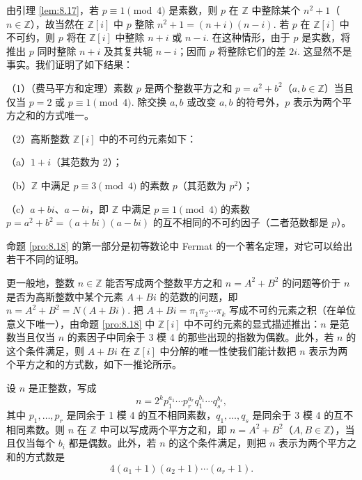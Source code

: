 由引理 \ref{lem:8.17}，若 \(p \equiv 1 \pmod 4\) 是素数，则 \(p\) 在 \(\mathbb{Z}\) 中整除某个 \(n^2+1\)（\(n \in \mathbb{Z}\)），故当然在 \(\mathbb{Z}[i]\) 中 \(p\) 整除 \(n^2+1 = (n+i)(n-i)\). 若 \(p\) 在 \(\mathbb{Z}[i]\) 中不可约，则 \(p\) 将在 \(\mathbb{Z}[i]\) 中整除 \(n+i\) 或 \(n-i\). 在这种情形，由于 \(p\) 是实数，将推出 \(p\) 同时整除 \(n+i\) 及其复共轭 \(n-i\)；因而 \(p\) 将整除它们的差 \(2i\). 这显然不是事实。我们证明了如下结果：

\begin{proposition}\label{pro:8.18}
（1）（费马平方和定理）素数 \(p\) 是两个整数平方之和 \(p = a^2+b^2\)（\(a, b \in \mathbb{Z}\)）当且仅当 \(p = 2\) 或 \(p \equiv 1 \pmod 4\). 除交换 \(a, b\) 或改变 \(a, b\) 的符号外，\(p\) 表示为两个平方之和的方式唯一。

（2）高斯整数 \(\mathbb{Z}[i]\) 中的不可约元素如下：

（a）\(1+i\)（其范数为 2）；

（b）\(\mathbb{Z}\) 中满足 \(p \equiv 3 \pmod 4\) 的素数 \(p\)（其范数为 \(p^2\)）；

（c）\(a+bi\)、\(a-bi\)，即 \(\mathbb{Z}\) 中满足 \(p \equiv 1 \pmod 4\) 的素数 \(p = a^2+b^2 = (a+bi)(a-bi)\) 的互不相同的不可约因子（二者范数都是 \(p\)）。
\end{proposition}

命题 \ref{pro:8.18} 的第一部分是初等数论中 Fermat 的一个著名定理，对它可以给出若干不同的证明。

更一般地，整数 \(n \in \mathbb{Z}\) 能否写成两个整数平方之和 \(n = A^2+B^2\) 的问题等价于 \(n\) 是否为高斯整数中某个元素 \(A+Bi\) 的范数的问题，即 \(n = A^2+B^2 = N(A+Bi)\). 把 \(A+Bi = \pi_1\pi_2\cdots\pi_k\) 写成不可约元素之积（在单位意义下唯一），由命题 \ref{pro:8.18} 中 \(\mathbb{Z}[i]\) 中不可约元素的显式描述推出：\(n\) 是范数当且仅当 \(n\) 的素因子中同余于 3 模 4 的那些出现的指数为偶数。此外，若 \(n\) 的这个条件满足，则 \(A+Bi\) 在 \(\mathbb{Z}[i]\) 中分解的唯一性使我们能计数把 \(n\) 表示为两个平方之和的方式数，如下一推论所示。

\begin{corollary}\label{cor:8.19}
设 \(n\) 是正整数，写成
\[
n = 2^k p_1^{a_1}\cdots p_r^{a_r} q_1^{b_1}\cdots q_s^{b_s},
\]
其中 \(p_1, \ldots, p_r\) 是同余于 1 模 4 的互不相同素数，\(q_1, \ldots, q_s\) 是同余于 3 模 4 的互不相同素数。则 \(n\) 在 \(\mathbb{Z}\) 中可以写成两个平方之和，即 \(n = A^2+B^2\)（\(A, B \in \mathbb{Z}\)），当且仅当每个 \(b_i\) 都是偶数。此外，若 \(n\) 的这个条件满足，则把 \(n\) 表示为两个平方之和的方式数是
\[
4(a_1+1)(a_2+1)\cdots(a_r+1).
\]
\end{corollary}

